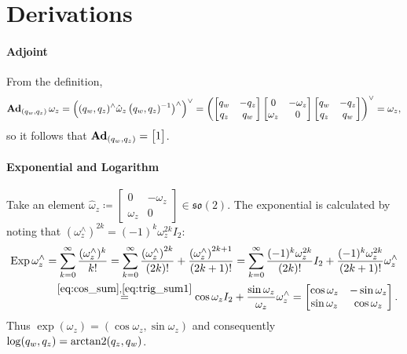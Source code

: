 \section{Derivations}

\paragraph{Adjoint}

From the definition,
\begin{equation}
    \operatorname{\textbf{Ad}}_{(q_{w}, q_{z})} \omega_{z} = \left( (q_{w}, q_{z})^{\wedge} \hat \omega_{z} \left (q_{w}, q_{z})^{-1} \right)^{\wedge} \right)^{\vee} = \left(
      \begin{bmatrix}
        q_{w} & -q_{z} \\ q_{z} & q_{w}
      \end{bmatrix}
      \begin{bmatrix}
        0 & -\omega_{z} \\ \omega_{z} & 0
      \end{bmatrix}\begin{bmatrix}
        q_{w} & -q_{z} \\ q_{z} & q_{w}
      \end{bmatrix}
    \right)^{\vee} = \omega_{z},
\end{equation}
so it follows that $\operatorname{\textbf{Ad}}_{(q_{w}, q_{z})} = \begin{bmatrix} 1 \end{bmatrix}$.

\paragraph{Exponential and Logarithm}

Take an element $\hat \omega_z \coloneq \begin{bmatrix} 0 & -\omega_z \\ \omega_z & 0 \end{bmatrix} \in \mathfrak{so}(2)$. The exponential is calculated by noting that $(\omega_z^\wedge)^{2k} = (-1)^{k} \omega_z^{2k} I_2$:
\begin{equation}
  \begin{aligned}
    \operatorname{Exp} {\omega_z^\wedge} = \sum_{k = 0}^{\infty} \frac{(\omega_z^\wedge)^k}{k!} = \sum_{k = 0}^{\infty} \frac{\left(\omega_{z}^{\wedge}\right)^{2k}}{(2k)!} + \frac{\left(\omega_{z}^{\wedge}\right)^{2k + 1}}{(2k + 1)!} = \sum_{k = 0}^{\infty} \frac{(-1)^{k} \omega_{z}^{2k}}{(2k)!} I_{2} + \frac{(-1)^{k} \omega_{z}^{2k}}{(2k + 1)!} \omega_{z}^{\wedge} \\
    \overset{\eqref{eq:cos_sum}, \eqref{eq:trig_sum1}}= \cos \omega_z I_2 + \frac{\sin \omega_{z}}{\omega_{z}} \omega_z^\wedge = \begin{bmatrix} \cos \omega_z & - \sin \omega_z \\ \sin \omega_z & \cos \omega_z \end{bmatrix}.
  \end{aligned}
\end{equation}
Thus $\exp(\omega_{z}) = (\cos \omega_{z}, \sin \omega_{z})$ and consequently $\log (q_{w}, q_{z}) = \operatorname{arctan2}(q_{z}, q_{w})$.

